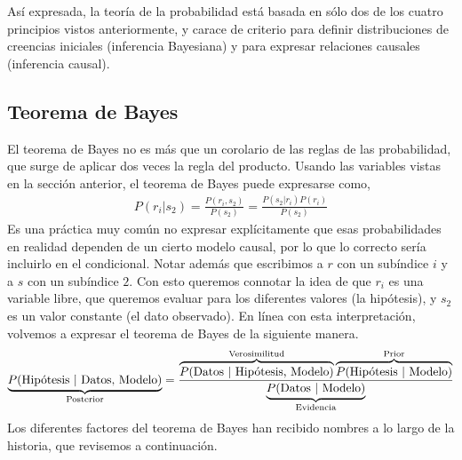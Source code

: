\documentclass[a4paper,10pt]{book}
\theoremstyle{definition}
\begin{document}

As\'i expresada, la teor\'ia de la probabilidad est\'a basada en s\'olo dos de los cuatro principios vistos anteriormente, y carace de criterio para definir distribuciones de creencias iniciales (inferencia Bayesiana) y para expresar relaciones causales (inferencia causal).

\subsection{Teorema de Bayes}

El teorema de Bayes no es m\'as que un corolario de las reglas de las probabilidad, que surge de aplicar dos veces la regla del producto.
%
Usando las variables vistas en la secci\'on anterior, el teorema de Bayes puede expresarse como,
\begin{equation}
\begin{split}
P(r_i|s_2) = \frac{P(r_i, s_2)}{P(s_2)} = \frac{P(s_2|r_i)P(r_i)}{P(s_2)} 
\end{split}
\end{equation}
%
Es una pr\'actica muy común no expresar expl\'icitamente que esas probabilidades en realidad dependen de un cierto modelo causal, por lo que lo correcto ser\'ia incluirlo en el condicional.
%
Notar adem\'as que escribimos a $r$ con un sub\'indice $i$ y a $s$ con un sub\'indice $2$.
%
Con esto queremos connotar la idea de que $r_i$ es una variable libre, que queremos evaluar para los diferentes valores (la hip\'otesis), y $s_2$ es un valor constante (el dato observado).
%
En l\'inea con esta interpretaci\'on, volvemos a expresar el teorema de Bayes de la siguiente manera.
%
\begin{equation*}
\underbrace{P(\text{Hip\'otesis }|\text{ Datos, Modelo})}_{\text{\scriptsize Posterior}} = \frac{\overbrace{P(\text{Datos }|\text{ Hip\'otesis, Modelo})}^{\text{\scriptsize Verosimilitud}} \overbrace{P(\text{Hip\'otesis }|\text{ Modelo})}^{\text{\scriptsize Prior}} }{\underbrace{P(\text{Datos }|\text{ Modelo})}_{\text{\scriptsize Evidencia}}}
\end{equation*}
%
Los diferentes factores del teorema de Bayes han recibido nombres a lo largo de la historia, que revisemos a continuaci\'on.
\end{document}
